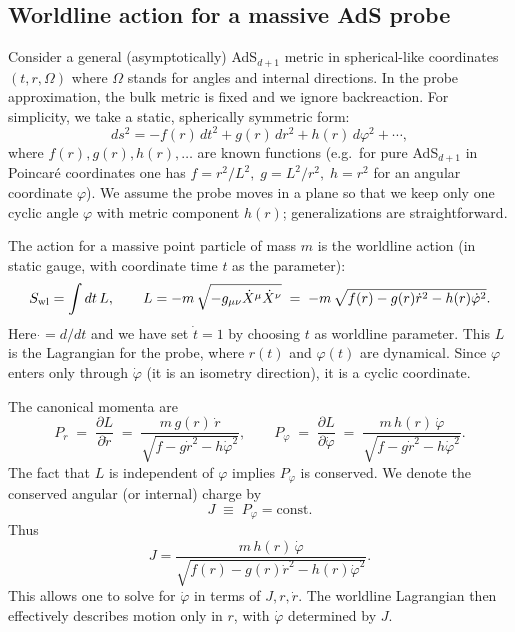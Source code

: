 \documentclass[11pt]{article}
\begin{document}
\subsection{Worldline action for a massive AdS probe}

Consider a general (asymptotically) AdS$_{d+1}$ metric in spherical-like coordinates $(t,r,\Omega)$ where $\Omega$ stands for angles and internal directions.  In the probe approximation, the bulk metric is fixed and we ignore backreaction.  For simplicity, we take a static, spherically symmetric form: 
\begin{equation*}
ds^2 = -f(r)\,dt^2 + g(r)\,dr^2 + h(r)\,d\varphi^2 + \cdots,
\end{equation*}
where $f(r),g(r),h(r),\dots$ are known functions (e.g.\ for pure AdS$_{d+1}$ in Poincar\'e coordinates one has $f = r^2/L^2,\; g = L^2/r^2,\; h = r^2$ for an angular coordinate $\varphi$).  We assume the probe moves in a plane so that we keep only one cyclic angle $\varphi$ with metric component $h(r)$; generalizations are straightforward.

The action for a massive point particle of mass $m$ is the worldline action (in static gauge, with coordinate time $t$ as the parameter):
\begin{equation}
S_{\rm wl} = \int dt\,L,
\qquad
L = -m\,\sqrt{-g_{\mu\nu}\dot X^\mu \dot X^\nu}
\;=\;
-m\,\sqrt{f(r) - g(r)\dot r^2 - h(r)\dot\varphi^2}.
\label{eq:toy-lagrangian}
\end{equation}
Here $\dot{}=d/dt$ and we have set $\dot t =1$ by choosing $t$ as worldline parameter.  This $L$ is the Lagrangian for the probe, where $r(t)$ and $\varphi(t)$ are dynamical.  Since $\varphi$ enters only through $\dot\varphi$ (it is an isometry direction), it is a cyclic coordinate.  

The canonical momenta are
\begin{equation*}
P_r \;=\; \frac{\partial L}{\partial \dot r}
\;=\; \frac{m\,g(r)\,\dot r}{\sqrt{f - g\dot r^2 - h\dot\varphi^2}},
\qquad
P_\varphi \;=\; \frac{\partial L}{\partial \dot\varphi}
\;=\; \frac{m\,h(r)\,\dot\varphi}{\sqrt{f - g\dot r^2 - h\dot\varphi^2}}.
\end{equation*}
The fact that $L$ is independent of $\varphi$ implies $P_\varphi$ is conserved.  We denote the conserved angular (or internal) charge by 
\begin{equation*}
J \;\equiv\; P_\varphi = \text{const}.
\end{equation*}
Thus 
\begin{equation}
J = \frac{m\,h(r)\,\dot\varphi}{\sqrt{f(r) - g(r)\dot r^2 - h(r)\dot\varphi^2}}.
\label{eq:Jdef}
\end{equation}
This allows one to solve for $\dot\varphi$ in terms of $J, r, \dot r$.  The worldline Lagrangian then effectively describes motion only in $r$, with $\dot\varphi$ determined by $J$.
\end{document}
